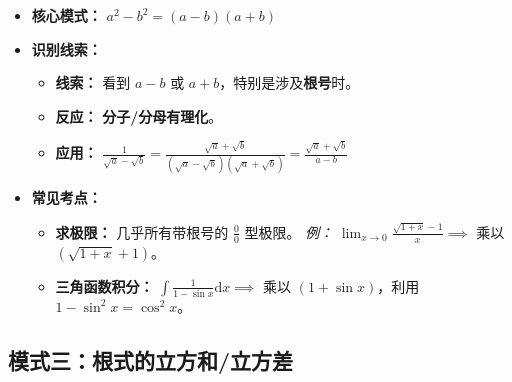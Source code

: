 \documentclass[lang=cn,math=mtpro2,11pt,scheme=chinese]{elegantbook}
\begin{document}
\begin{itemize}
    \item \textbf{核心模式：} $a^2 - b^2 = (a - b)(a + b)$

    \item \textbf{识别线索：}
    \begin{itemize}
        \item \textbf{线索：} 看到 $a-b$ 或 $a+b$，特别是涉及\textbf{根号}时。
        \item \textbf{反应：} \textbf{分子/分母有理化}。
        \item \textbf{应用：} $\frac{1}{\sqrt{a} - \sqrt{b}} = \frac{\sqrt{a} + \sqrt{b}}{(\sqrt{a} - \sqrt{b})(\sqrt{a} + \sqrt{b})} = \frac{\sqrt{a} + \sqrt{b}}{a - b}$
    \end{itemize}

    \item \textbf{常见考点：}
    \begin{itemize}
        \item \textbf{求极限：} 几乎所有带根号的 $\frac{0}{0}$ 型极限。
            \textit{例：} $\lim_{x \to 0} \frac{\sqrt{1+x} - 1}{x} \implies$ 乘以 $(\sqrt{1+x} + 1)$。
        \item \textbf{三角函数积分：} $\int \frac{1}{1 - \sin x} \mathrm{d}x \implies$ 乘以 $(1 + \sin x)$，利用 $1 - \sin^2 x = \cos^2 x$。
    \end{itemize}
\end{itemize}

\subsection{模式三：根式的立方和/立方差}
\end{document}
